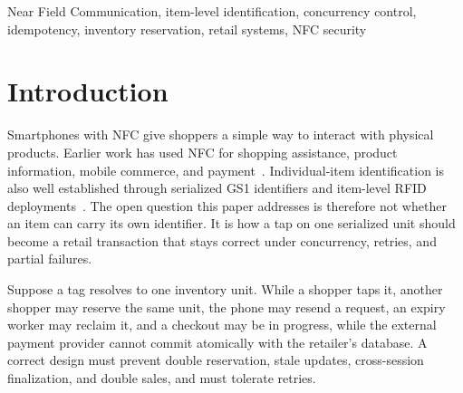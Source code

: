 \documentclass[conference]{IEEEtran}
\begin{document}
\begin{IEEEkeywords}
Near Field Communication, item-level identification, concurrency
control, idempotency, inventory reservation, retail systems, NFC
security
\end{IEEEkeywords}

\section{Introduction}

Smartphones with NFC give shoppers a simple way to interact with
physical products. Earlier work has used NFC for shopping assistance,
product information, mobile commerce, and
payment~\cite{refCoskun,refHusni,refParadowski,refBroll,refDave,refJe}.
Individual-item identification is also well established through
serialized GS1 identifiers and item-level RFID
deployments~\cite{refGS1TDS,refChoi,refCilloni,refHou}. The open
question this paper addresses is therefore not whether an item can
carry its own identifier. It is how a tap on one serialized unit
should become a retail transaction that stays correct under
concurrency, retries, and partial failures.

Suppose a tag resolves to one inventory unit. While a shopper taps
it, another shopper may reserve the same unit, the phone may resend a
request, an expiry worker may reclaim it, and a checkout may be in
progress, while the external payment provider cannot commit
atomically with the retailer's database. A correct design must
prevent double reservation, stale updates, cross-session
finalization, and double sales, and must tolerate retries.
\end{document}
